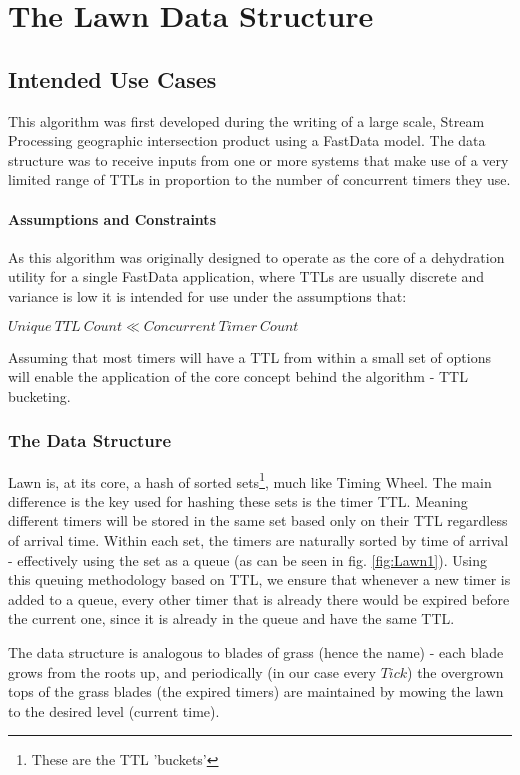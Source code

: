 \documentclass[conference]{IEEEtran}
\begin{document}
\section{The Lawn Data Structure}
 
\subsection{Intended Use Cases}

This algorithm was first developed during the writing of a large scale, Stream Processing geographic intersection product\cite{VUSR} using a FastData\cite{GP} model. The data structure was to receive inputs from one or more systems that make use of a very limited range of TTLs in proportion to the number of concurrent timers they use. 

\paragraph{Assumptions and Constraints}
As this algorithm was originally designed to operate as the core of a dehydration utility for a single FastData application, where TTLs are usually discrete and variance is low it is intended for use under the assumptions that: 
\begin{center}
	$ Unique\ TTL\ Count \ll Concurrent\ Timer\ Count $
\end{center}
Assuming that most timers will have a TTL from within a small set of options will enable the application of the core concept behind the algorithm - TTL bucketing. 

\subsubsection{The Data Structure}
Lawn is, at its core, a hash of sorted sets\footnote{These are the TTL 'buckets'}, much like Timing Wheel. The main difference is the key used for hashing these sets is the timer TTL. Meaning different timers will be stored in the same set based only on their TTL regardless of arrival time. Within each set, the timers are naturally sorted by time of arrival - effectively using the set as a queue  (as can be seen in fig. \ref{fig:Lawn1}). Using this queuing methodology based on TTL, we ensure that whenever a new timer is added to a queue, every other timer that is already there would be expired before the current one, since it is already in the queue and have the same TTL.

The data structure is analogous to blades of grass (hence the name) - each blade grows from the roots up, and periodically (in our case every $Tick$) the overgrown tops of the grass blades (the expired timers) are maintained by mowing the lawn to the desired level (current time).
\end{document}
